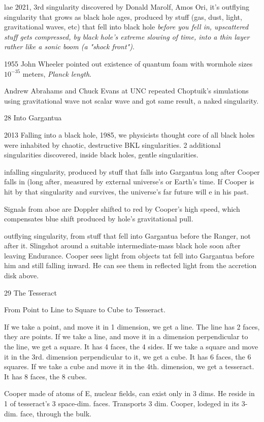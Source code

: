 \documentclass[10pt]{amsart}
\begin{document}
lae 2021, 3rd singularity discovered by Donald Marolf, Amos Ori, it's outflying singularity that grows as black hole ages, produced by stuff (gas, dust, light, gravitational waves, etc) that fell into black hole \emph{before you fell in, upscattered stuff gets compressed, by black hole's extreme slowing of time, into a thin layer rather like a sonic boom (a "shock front")}.

1955 John Wheeler pointed out existence of quantum foam with wormhole sizes $10^{-35}$ meters, \emph{Planck length}.

Andrew Abrahams and Chuck Evans at UNC repeated Choptuik's simulations using gravitational wave not scalar wave and got same result, a naked singularity.

28 Into Gargantua

2013 Falling into a black hole, 1985, we physicists thought core of all black holes were inhabited by chaotic, destructive BKL singularities. 2 additional singularities discovered, inside black holes, gentle singularities.

infalling singularity, produced by stuff that falls into Gargantua long after Cooper falls in (long after, measured by external universe's or Earth's time. If Cooper is hit by that singularity and survives, the universe's far future will e in his past.

Signals from aboe are Doppler shifted to red by Cooper's high speed, which compensates blue shift produced by hole's gravitational pull.

outflying singularity, from stuff that fell into Gargantua before the Ranger, not after it. Slingshot around a suitable intermediate-mass black hole soon after leaving Endurance.
Cooper sees light from objects tat fell into Gargantua before him and still falling inward. He can see them in reflected light from the accretion disk above.

29 The Tesseract

From Point to Line to Square to Cube to Tesseract.

If we take a point, and move it in 1 dimension, we get a line. The line has 2 faces, they are points.
If we take a line, and move it in a dimension perpendicular to the line, we get a square. It has 4 faces, the 4 sides.
If we take a square and move it in the 3rd. dimension perpendicular to it, we get a cube. It has 6 faces, the 6 squares.
If we take a cube and move it in the 4th. dimension, we get a tesseract. It has 8 faces, the 8 cubes.

Cooper made of atoms of E, nuclear fields, can exist only in 3 dims. He reside in 1 of tesseract's 3 space-dim. faces.
Transports 3 dim. Cooper, lodeged in its 3-dim. face, through the bulk.
\end{document}
